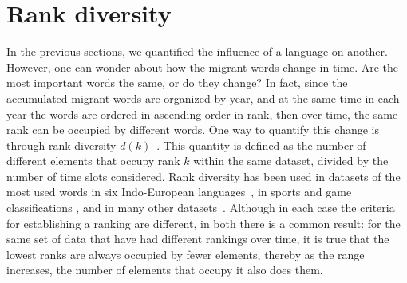 \documentclass[10pt,letterpaper]{article} %
\begin{document}
\section*{Rank diversity} %

In the previous sections, we quantified the influence of a language on another. However, 
one can wonder about how the migrant words change in time. Are the most important words
the same, or do they change? In fact, 
since the accumulated migrant words are organized by year, and at the same time
in each year the words are ordered in ascending order in rank, then over time,
the same rank can be occupied by different words. One way to quantify
this change is through rank diversity $d(k)$~\cite{iplosone}. This quantity is
defined as the number 
of different elements that occupy rank  $k$ within the same dataset, divided
by the number of time slots considered.
Rank diversity has been used in datasets of the most used words in six
Indo-European languages~\cite{iplosone}, in sports and game classifications \cite{Morales_epj}, 
and in many other datasets~\cite{Iniguez2022}. 
Although in
each case the criteria for establishing a ranking are different, in both there
is a common result: for the same set of data that have had different rankings
over time, it is true that the lowest ranks are always occupied by fewer
elements, thereby as the range increases, the number of elements that occupy it
also does them.
\end{document}
